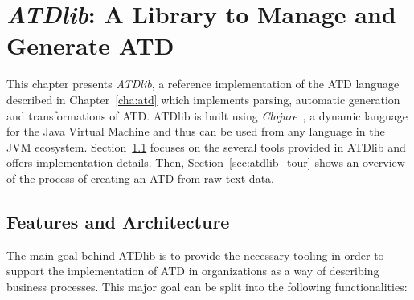 \chapter{\emph{ATDlib}: A Library to Manage and Generate ATD}
\label{cha:atdlib}

This chapter presents \emph{ATDlib}, a reference implementation of the ATD
language described in Chapter~\ref{cha:atd} which implements parsing, automatic
generation and transformations of ATD. ATDlib is built using
\emph{Clojure}~\cite{Hickey:2008:CPL:1408681.1408682}, a dynamic language for the
Java Virtual Machine and thus can be used from any language in the JVM
ecosystem. Section~\ref{sec:architecture} focuses on the several tools provided
in ATDlib and offers implementation details. Then, Section~\ref{sec:atdlib_tour}
shows an overview of the process of creating an ATD from raw text data.

\section{Features and Architecture}
\label{sec:architecture}

The main goal behind ATDlib is to provide the necessary tooling in order to
support the implementation of ATD in organizations as a way of describing
business processes. This major goal can be split into the following
functionalities:


